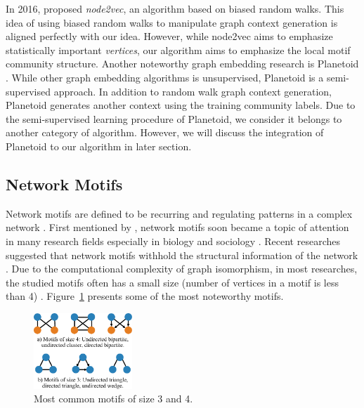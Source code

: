\documentclass[letterpaper]{article}
\begin{document}
            In 2016, \citeauthor{node2vec} proposed \emph{node2vec}, an algorithm based on biased random
            walks. This idea of using biased random walks to manipulate graph context generation
            is aligned perfectly with our idea. However, while node2vec aims to emphasize statistically
            important \emph{vertices}, our algorithm aims to emphasize the local motif community
            structure. Another noteworthy graph embedding research is Planetoid \cite{planetoid}. 
            While other graph embedding algorithms is unsupervised, 
            Planetoid is a semi-supervised approach. In addition to random walk graph context generation, 
            Planetoid generates another context using the training community labels. Due to the
            semi-supervised learning procedure of Planetoid, we consider it belongs to another
            category of algorithm. However, we will discuss the integration of Planetoid to our
            algorithm in later section.

        \subsection{Network Motifs}

            Network motifs are defined to be recurring and regulating patterns in a complex network 
            \cite{netmotif}. First mentioned by \cite{motifblockmilo}, network motifs
            soon became a topic of attention in many research fields especially in biology and sociology
            \cite{masoudirev}. Recent researches suggested that network motifs withhold the structural 
            information of the network \cite{juremotif,deepgraphkernel}. Due to the
            computational complexity of graph isomorphism, in most researches, the studied motifs 
            often has a small size (number of vertices in a motif is less than 4) \cite{motifdecrev}.
            Figure~\ref{fig:motifs} presents some of the most noteworthy motifs.

            \begin{figure}
                \centering
                \includegraphics[width=0.33\textwidth]{fig7_motifs}
                \caption{Most common motifs of size 3 and 4.}
                \label{fig:motifs}
            \end{figure}
\end{document}
